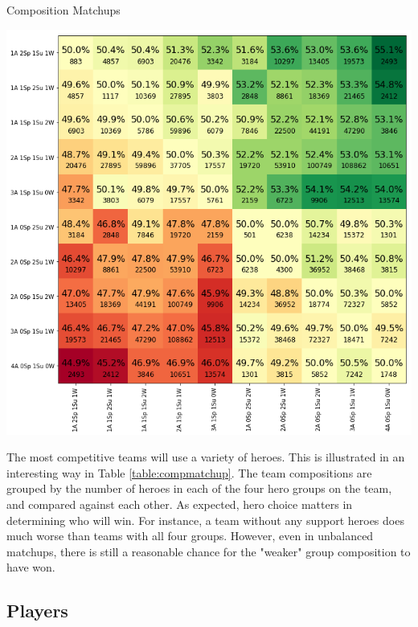 \documentclass[twoside,twocolumn]{article}
\begin{document}
\begin{table}
\caption{Composition Matchups}
\label{table:compmatchup}
\centering
\includegraphics[width=\textwidth]{compmatchup}
\end{table}

The most competitive teams will use a variety of heroes.  This is illustrated in an interesting way in Table \ref{table:compmatchup}.  The team compositions are grouped by the number of heroes in each of the four hero groups on the team, and compared against each other.  As expected, hero choice matters in determining who will win.  For instance, a team without any support heroes does much worse than teams with all four groups.  However, even in unbalanced matchups, there is still a reasonable chance for the "weaker" group composition to have won.

\subsection {Players}
\label{players}
\end{document}
